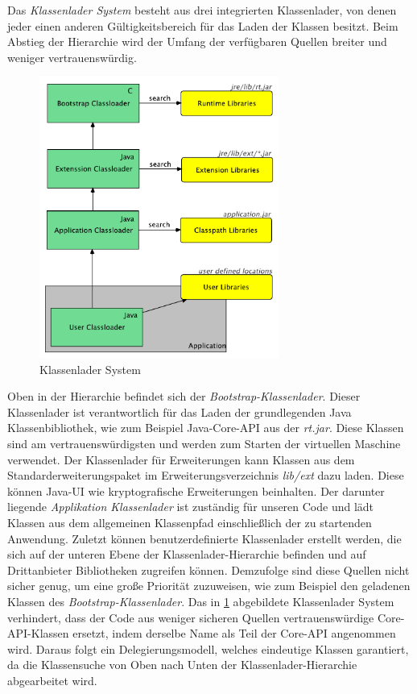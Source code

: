     Das \textit{Klassenlader System} besteht aus drei integrierten Klassenlader, von denen jeder einen anderen Gültigkeitsbereich für das Laden der Klassen besitzt. Beim Abstieg der Hierarchie wird der Umfang der verfügbaren Quellen breiter und weniger vertrauenswürdig. 

    \begin{figure}[h!]
      \centering
      \includegraphics[width=0.7\textwidth]{material/images/Classloader-Hierarhie2.pdf}
      \caption{Klassenlader System \cite{classLoadingIntro}}
      \label{fig:cl}
    \end{figure}
    
    Oben in der Hierarchie befindet sich der \textit{Bootstrap-Klassenlader}. Dieser Klassenlader ist verantwortlich für das Laden der grundlegenden Java Klassenbibliothek, wie zum Beispiel Java-Core-API aus der \textit{rt.jar}. Diese Klassen sind am vertrauenswürdigsten und werden zum Starten der virtuellen Maschine verwendet. Der Klassenlader für Erweiterungen kann Klassen  aus dem Standarderweiterungspaket im Erweiterungsverzeichnis \textit{lib/ext} dazu laden. Diese können Java-UI wie kryptografische Erweiterungen beinhalten. Der darunter liegende \textit{Applikation Klassenlader} ist zuständig für unseren Code und lädt Klassen aus dem allgemeinen Klassenpfad einschließlich der zu startenden Anwendung. Zuletzt können benutzerdefinierte Klassenlader erstellt werden, die sich auf der unteren Ebene der Klassenlader-Hierarchie befinden und auf Drittanbieter Bibliotheken zugreifen können. Demzufolge sind diese Quellen nicht sicher genug, um eine große Priorität zuzuweisen, wie zum Beispiel den geladenen Klassen des \textit{Bootstrap-Klassenlader}.\bigbreak 
    Das in \ref{fig:cl} abgebildete Klassenlader System verhindert, dass der Code aus weniger sicheren Quellen vertrauenswürdige Core-API-Klassen ersetzt, indem derselbe Name als Teil der Core-API angenommen wird. Daraus folgt ein Delegierungsmodell, welches eindeutige Klassen garantiert, da die Klassensuche von Oben nach Unten der Klassenlader-Hierarchie abgearbeitet wird.  \cite{classLoadingIntro} 
    

